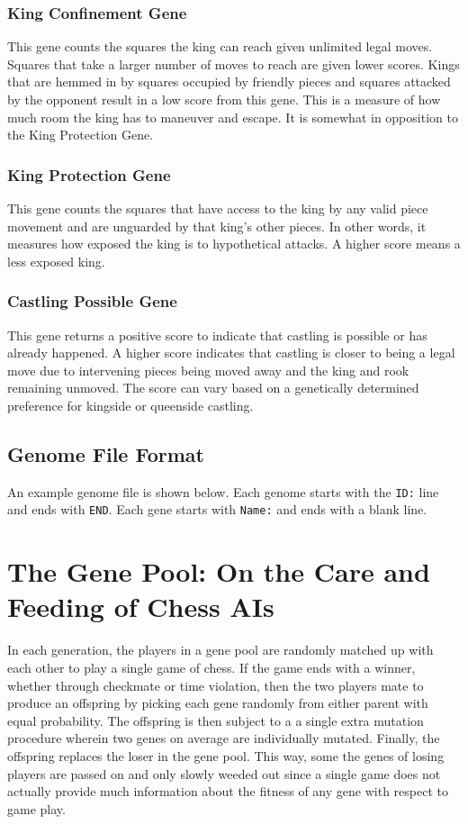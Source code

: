\documentclass[letterpaper]{article}
\renewcommand{\_}{\allowbreak\textunderscore\allowbreak}
\begin{document}
\subsubsection{King Confinement Gene}
This gene counts the squares the king can reach given unlimited legal moves. Squares that take a larger number of moves to reach are given lower scores. Kings that are hemmed in by squares occupied by friendly pieces and squares attacked by the opponent result in a low score from this gene. This is a measure of how much room the king has to maneuver and escape. It is somewhat in opposition to the King Protection Gene.

\subsubsection{King Protection Gene}
This gene counts the squares that have access to the king by any valid piece movement and are unguarded by that king's other pieces. In other words, it measures how exposed the king is to hypothetical attacks. A higher score means a less exposed king.

\subsubsection{Castling Possible Gene}
This gene returns a positive score to indicate that castling is possible or has already happened. A higher score indicates that castling is closer to being a legal move due to intervening pieces being moved away and the king and rook remaining unmoved. The score can vary based on a genetically determined preference for kingside or queenside castling.

\subsection{Genome File Format}
An example genome file is shown below. Each genome starts with the \verb|ID:| line and ends with \verb|END|. Each gene starts with \verb|Name:| and ends with a blank line.



\section{The Gene Pool: On the Care and Feeding of Chess AIs}

In each generation, the players in a gene pool are randomly matched up with each other to play a single game of chess. If the game ends with a winner, whether through checkmate or time violation, then the two players mate to produce an offspring by picking each gene randomly from either parent with equal probability. The offspring is then subject to a a single extra mutation procedure wherein two genes on average are individually mutated. Finally, the offspring replaces the loser in the gene pool. This way, some the genes of losing players are passed on and only slowly weeded out since a single game does not actually provide much information about the fitness of any gene with respect to game play.
\end{document}
